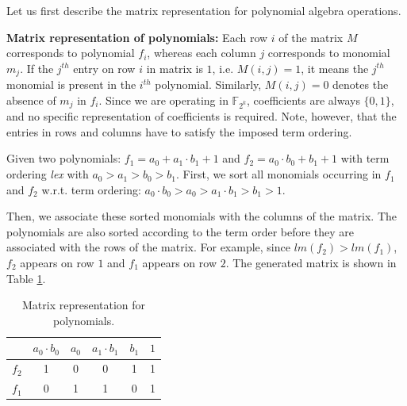 
Let us first describe the matrix representation for polynomial algebra
operations. 


{\bf Matrix representation of polynomials:} Each row $i$ of the matrix
$M$ corresponds to polynomial $f_i$, whereas each column $j$
corresponds to monomial $m_j$.
If the $j^{th}$ entry on row $i$ in matrix is $1$, i.e. $M(i, j) = 1$,
it means the $j^{th}$ monomial is present in the $i^{th}$ polynomial.
Similarly, $M(i, j) = 0$ denotes the absence of $m_j$ in $f_i$. 
Since we are operating in $\mathbb{F}_{2^k}$, coefficients
are always $\{0, 1\}$, and no specific representation of coefficients
is required. Note, however, that the entries in rows and columns have
to satisfy the imposed term ordering. 
 
\begin{Example}
Given two polynomials: $f_{1}=a_{0}+a_{1}\cdot b_{1}+1$ and
$f_{2}=a_{0}\cdot b_{0}+b_{1}+1$ with term ordering {\it lex} with
$a_{0}>a_{1}>b_{0}>b_{1}$.  First, we sort all monomials occurring in
$f_{1}$ and $f_{2}$ w.r.t. term ordering: $a_{0}\cdot b_{0}
>a_{0}>a_{1}\cdot b_{1}> b_{1}>1$. 

Then, we associate these sorted monomials with the columns of the
matrix. The polynomials are also sorted according to the term order
before they are associated with the rows of the matrix. For example,
since $lm(f_{2})>lm(f_{1})$, $f_{2}$ appears on row $1$ and $f_{1}$
appears on row $2$. 
The generated matrix is shown in Table \ref{tab:matrix}. 

	\begin{table}[htb]
	\begin{center}
	\caption{Matrix representation for polynomials.}
	\label{tab:matrix}
	\begin{tabular}{|c|c|c|c|c|c|} \hline 
			&$a_{0}\cdot b_{0}$  	&$a_{0}$ 	&$a_{1}\cdot b_{1}$		&$b_{1}$ 	&$1$  \\
	\hline 
	$f_{2}$ & 1 &0 & 0 & 1 & 1 \\
	\hline
	$f_{1}$ & 0 &1 & 1 & 0 & 1 \\
	\hline
	\end{tabular}
	\end{center}
	\end{table}
\end{Example}	


